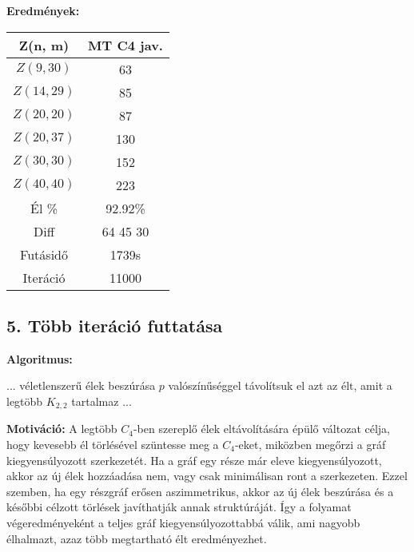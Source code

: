 \documentclass[12pt,a4paper]{article}
\begin{document}
\textbf{Eredmények:}
\begin{table}[H]
\centering
\begin{tabular}{|c|c|}
\hline
\textbf{Z(n, m)} & \textbf{MT C4 jav.} \\
\hline
$Z(9,30)$  & 63 \\
$Z(14, 29)$ & 85 \\
$Z(20, 20)$ & 87 \\
$Z(20, 37)$ & 130 \\
$Z(30, 30)$ & 152 \\
$Z(40, 40)$ & 223 \\
\hline
Él \% & 92.92\% \\
\hline
Diff & 64 45 30 \\
\hline
Futásidő & 1739s \\
Iteráció & 11000 \\
\hline
\end{tabular}
\end{table}

\subsection*{5. Több iteráció futtatása}
\textbf{Algoritmus:}

\begin{algorithm}[H]
\begin{algorithmic}[1]
    \State ...
        \State véletlenszerű élek beszúrása $p$ valószínűséggel
            \State távolítsuk el azt az $\text{élt}$, amit a legtöbb $K_{2,2}$ tartalmaz
        \EndWhile
    \EndFor
    \State ...
\end{algorithmic}
\end{algorithm}

\textbf{Motiváció:} A legtöbb $C_4$-ben szereplő élek eltávolítására épülő változat célja, hogy kevesebb él törlésével szüntesse meg a $C_4$-eket, miközben megőrzi a gráf kiegyensúlyozott szerkezetét. Ha a gráf egy része már eleve kiegyensúlyozott, akkor az új élek hozzáadása nem, vagy csak minimálisan ront a szerkezeten. Ezzel szemben, ha egy részgráf erősen aszimmetrikus, akkor az új élek beszúrása és a későbbi célzott törlések javíthatják annak struktúráját. Így a folyamat végeredményeként a teljes gráf kiegyensúlyozottabbá válik, ami nagyobb élhalmazt, azaz több megtartható élt eredményezhet.
\end{document}
